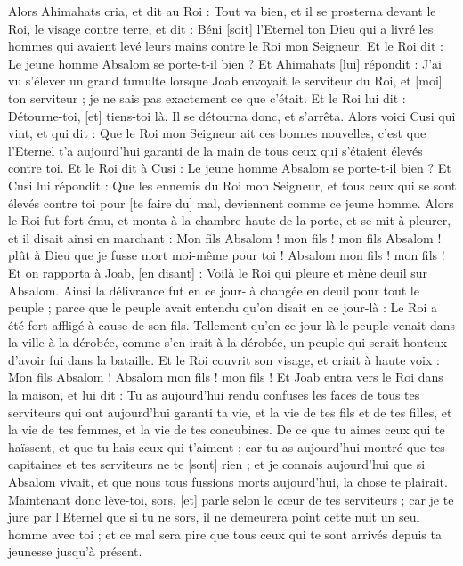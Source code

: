 \begin{multicols}{2}
Alors Ahimahats cria, et dit au Roi : Tout va bien, et il se prosterna devant le Roi, le visage contre terre, et dit : Béni [soit] l'Eternel ton Dieu qui a livré les hommes qui avaient levé leurs mains contre le Roi mon Seigneur.
Et le Roi dit : Le jeune homme Absalom se porte-t-il bien ? Et Ahimahats [lui] répondit : J'ai vu s'élever un grand tumulte lorsque Joab envoyait le serviteur du Roi, et [moi] ton serviteur ; je ne sais pas exactement ce que c'était.
Et le Roi lui dit : Détourne-toi, [et] tiens-toi là. Il se détourna donc, et s'arrêta.
Alors voici Cusi qui vint, et qui dit : Que le Roi mon Seigneur ait ces bonnes nouvelles, c'est que l'Eternel t'a aujourd'hui garanti de la main de tous ceux qui s'étaient élevés contre toi.
Et le Roi dit à Cusi : Le jeune homme Absalom se porte-t-il bien ? Et Cusi lui répondit : Que les ennemis du Roi mon Seigneur, et tous ceux qui se sont élevés contre toi pour [te faire du] mal, deviennent comme ce jeune homme.
Alors le Roi fut fort ému, et monta à la chambre haute de la porte, et se mit à pleurer, et il disait ainsi en marchant : Mon fils Absalom ! mon fils ! mon fils Absalom ! plût à Dieu que je fusse mort moi-même pour toi ! Absalom mon fils ! mon fils !
\VerseOne{}Et on rapporta à Joab, [en disant] : Voilà le Roi qui pleure et mène deuil sur Absalom.
Ainsi la délivrance fut en ce jour-là changée en deuil pour tout le peuple ; parce que le peuple avait entendu qu'on disait en ce jour-là : Le Roi a été fort affligé à cause de son fils.
Tellement qu'en ce jour-là le peuple venait dans la ville à la dérobée, comme s'en irait à la dérobée, un peuple qui serait honteux d'avoir fui dans la bataille.
Et le Roi couvrit son visage, et criait à haute voix : Mon fils Absalom ! Absalom mon fils ! mon fils !
Et Joab entra vers le Roi dans la maison, et lui dit : Tu as aujourd'hui rendu confuses les faces de tous tes serviteurs qui ont aujourd'hui garanti ta vie, et la vie de tes fils et de tes filles, et la vie de tes femmes, et la vie de tes concubines.
De ce que tu aimes ceux qui te haïssent, et que tu hais ceux qui t'aiment ; car tu as aujourd'hui montré que tes capitaines et tes serviteurs ne te [sont] rien ; et je connais aujourd'hui que si Absalom vivait, et que nous tous fussions morts aujourd'hui, la chose te plairait.
Maintenant donc lève-toi, sors, [et] parle selon le cœur de tes serviteurs ; car je te jure par l'Eternel que si tu ne sors, il ne demeurera point cette nuit un seul homme avec toi ; et ce mal sera pire que tous ceux qui te sont arrivés depuis ta jeunesse jusqu'à présent.

\end{multicols}
